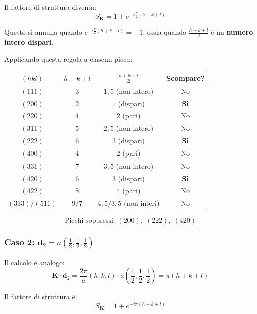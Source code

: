Il fattore di struttura diventa:
\begin{equation}
S_{\mathbf{K}} = 1 + e^{-i\frac{\pi}{2}(h+k+l)}
\end{equation}

Questo si annulla quando $e^{-i\frac{\pi}{2}(h+k+l)} = -1$, ossia quando $\frac{h+k+l}{2}$ è un \textbf{numero intero dispari}.

Applicando questa regola a ciascun picco:

\begin{table}[h!]
\centering
\begin{tabular}{|c|c|c|c|}
\hline
$(hkl)$ & $h+k+l$ & $\frac{h+k+l}{2}$ & Scompare? \\ \hline
$(111)$ & $3$ & $1{,}5$ (non intero) & No \\
$(200)$ & $2$ & $1$ (dispari) & \textbf{Sì} \\
$(220)$ & $4$ & $2$ (pari) & No \\
$(311)$ & $5$ & $2{,}5$ (non intero) & No \\
$(222)$ & $6$ & $3$ (dispari) & \textbf{Sì} \\
$(400)$ & $4$ & $2$ (pari) & No \\
$(331)$ & $7$ & $3{,}5$ (non intero) & No \\
$(420)$ & $6$ & $3$ (dispari) & \textbf{Sì} \\
$(422)$ & $8$ & $4$ (pari) & No \\
$(333)/(511)$ & $9/7$ & $4{,}5/3{,}5$ (non interi) & No \\ \hline
\end{tabular}
\end{table}

\begin{equation}
\boxed{\text{Picchi soppressi: } (200),\; (222),\; (420)}
\end{equation}

\subsubsection{Caso 2: $\mathbf{d}_2 = a\left(\frac{1}{2}, \frac{1}{2}, \frac{1}{2}\right)$}

Il calcolo è analogo:
\begin{equation}
\mathbf{K} \cdot \mathbf{d}_2 = \frac{2\pi}{a}(h, k, l) \cdot a\left(\frac{1}{2}, \frac{1}{2}, \frac{1}{2}\right) = \pi(h + k + l)
\end{equation}

Il fattore di struttura è:
\begin{equation}
S_{\mathbf{K}} = 1 + e^{-i\pi(h+k+l)}
\end{equation}

